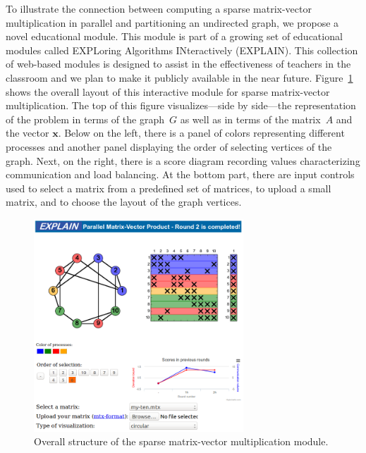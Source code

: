 \documentclass[12pt, oneside]{book}
\newcommand{\mat}[1]{\ensuremath{#1}}
\newcommand{\vek}[1]{{\ensuremath{\mathbf #1}}}
\begin{document}
To illustrate the connection between computing a sparse matrix-vector multiplication in
parallel and partitioning an undirected graph, we propose a novel educational module.
This module is part of a growing set of educational modules called EXPLoring Algorithms
INteractively (EXPLAIN). This collection of web-based modules is designed to assist in
the effectiveness of teachers in the classroom and we plan to make it publicly available
in the near future. Figure~\ref{f.explain.matvec} shows the overall layout of this interactive
module for sparse matrix-vector multiplication. The top of this figure visualizes---side
by side---the representation of the problem in terms of the graph~$G$ as well as in terms
of the matrix~\mat{A} and the vector \vek{x}. Below on the left, there is a panel of
colors representing different processes and another panel displaying the order of
selecting vertices of the graph. Next, on the right, there is a score diagram recording
values characterizing communication and load balancing. At the bottom part, there are
input controls used to select a matrix from a predefined set of matrices, to upload a
small matrix, and to choose the layout of the graph vertices.


\begin{figure}
\centering
\includegraphics[width=0.7\textwidth]{final}
\caption{Overall structure of the sparse matrix-vector multiplication module.}
\label{f.explain.matvec}
\end{figure}
\end{document}
